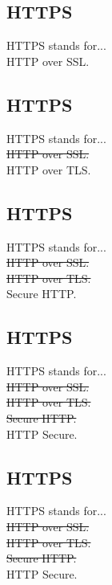 \documentclass[xga]{xdvislides}
\begin{document}
\subsection{HTTPS}
HTTPS stands for... \\

HTTP over SSL.

\subsection{HTTPS}
HTTPS stands for... \\

\sout{HTTP over SSL.} \\

HTTP over TLS.

\subsection{HTTPS}
HTTPS stands for... \\

\sout{HTTP over SSL.} \\

\sout{HTTP over TLS.} \\

Secure HTTP.

\subsection{HTTPS}
HTTPS stands for... \\

\sout{HTTP over SSL.} \\

\sout{HTTP over TLS.} \\

\sout{Secure HTTP.} \\

HTTP Secure.

\subsection{HTTPS}
HTTPS stands for... \\

\sout{HTTP over SSL.} \\

\sout{HTTP over TLS.} \\

\sout{Secure HTTP.} \\

HTTP Secure. \\
\end{document}
